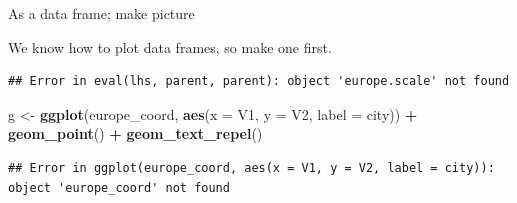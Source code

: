 \documentclass[ignorenonframetext,]{beamer}
\newenvironment{Shaded}{\begin{snugshade}}{\end{snugshade}}
\newcommand{\DataTypeTok}[1]{\textcolor[rgb]{0.13,0.29,0.53}{#1}}
\newcommand{\DecValTok}[1]{\textcolor[rgb]{0.00,0.00,0.81}{#1}}
\newcommand{\KeywordTok}[1]{\textcolor[rgb]{0.13,0.29,0.53}{\textbf{#1}}}
\newcommand{\NormalTok}[1]{#1}
\newcommand{\OperatorTok}[1]{\textcolor[rgb]{0.81,0.36,0.00}{\textbf{#1}}}
\newcommand{\StringTok}[1]{\textcolor[rgb]{0.31,0.60,0.02}{#1}}
\begin{document}
\begin{frame}[fragile]{As a data frame; make picture}
\protect\hypertarget{as-a-data-frame-make-picture}{}

We know how to plot data frames, so make one first.

\begin{Shaded}
\end{Shaded}

\begin{verbatim}
## Error in eval(lhs, parent, parent): object 'europe.scale' not found
\end{verbatim}

\begin{Shaded}
\begin{Highlighting}[]
\NormalTok{g <-}\StringTok{ }\KeywordTok{ggplot}\NormalTok{(europe_coord, }\KeywordTok{aes}\NormalTok{(}\DataTypeTok{x =}\NormalTok{ V1, }\DataTypeTok{y =}\NormalTok{ V2, }\DataTypeTok{label =}\NormalTok{ city)) }\OperatorTok{+}
\StringTok{  }\KeywordTok{geom_point}\NormalTok{() }\OperatorTok{+}\StringTok{ }\KeywordTok{geom_text_repel}\NormalTok{()}
\end{Highlighting}
\end{Shaded}

\begin{verbatim}
## Error in ggplot(europe_coord, aes(x = V1, y = V2, label = city)): object 'europe_coord' not found
\end{verbatim}

\end{frame}
\end{document}
